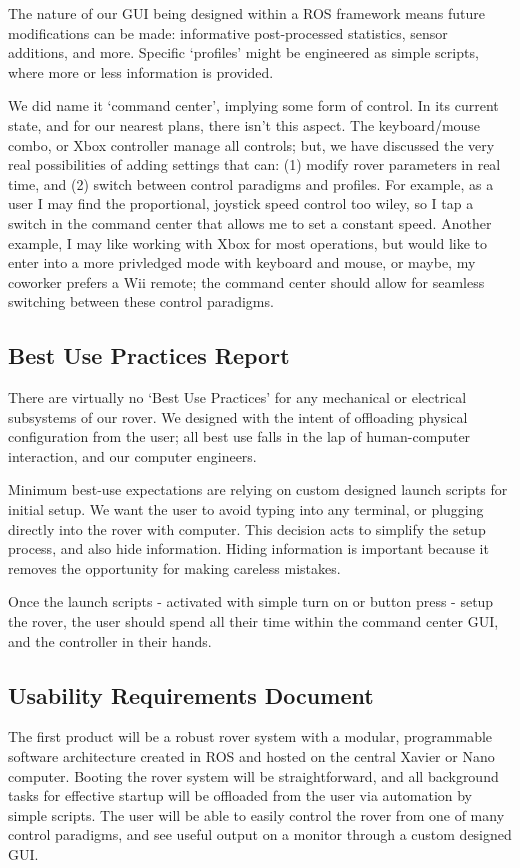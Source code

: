 \documentclass[a4paper, 10pt]{article}
\begin{document}
	The nature of our GUI being designed within a ROS framework means future modifications can be made: informative post-processed statistics, sensor additions, and more. Specific `profiles' might be engineered as simple scripts, where more or less information is provided.
	
	We did name it `command center', implying some form of control. In its current state, and for our nearest plans, there isn't this aspect. The keyboard/mouse combo, or Xbox controller manage all controls; but, we have discussed the very real possibilities of adding settings that can: (1) modify rover parameters in real time, and (2) switch between control paradigms and profiles. For example, as a user I may find the proportional, joystick speed control too wiley, so I tap a switch in the command center that allows me to set a constant speed. Another example, I may like working with Xbox for most operations, but would like to enter into a more privledged mode with keyboard and mouse, or maybe, my coworker prefers a Wii remote; the command center should allow for seamless switching between these control paradigms.


	\subsection{Best Use Practices Report}
	There are virtually no `Best Use Practices' for any mechanical or electrical subsystems of our rover. We designed with the intent of offloading physical configuration from the user; all best use falls in the lap of human-computer interaction, and our computer engineers.
	
	Minimum best-use expectations are relying on custom designed launch scripts for initial setup. We want the user to avoid typing into any terminal, or plugging directly into the rover with computer. This decision acts to simplify the setup process, and also hide information. Hiding information is important because it removes the opportunity for making careless mistakes. 
	
	Once the launch scripts - activated with simple turn on or button press - setup the rover, the user should spend all their time within the command center GUI, and the controller in their hands.

	\subsection{Usability Requirements Document}
	The first product will be a robust rover system with a modular, programmable software architecture created in ROS and hosted on the central Xavier or Nano computer. Booting the rover system will be straightforward, and all background tasks for effective startup will be offloaded from the user via automation by simple scripts. The user will be able to easily control the rover from one of many control paradigms, and see useful output on a monitor through a custom designed GUI. 
	
\end{document}

